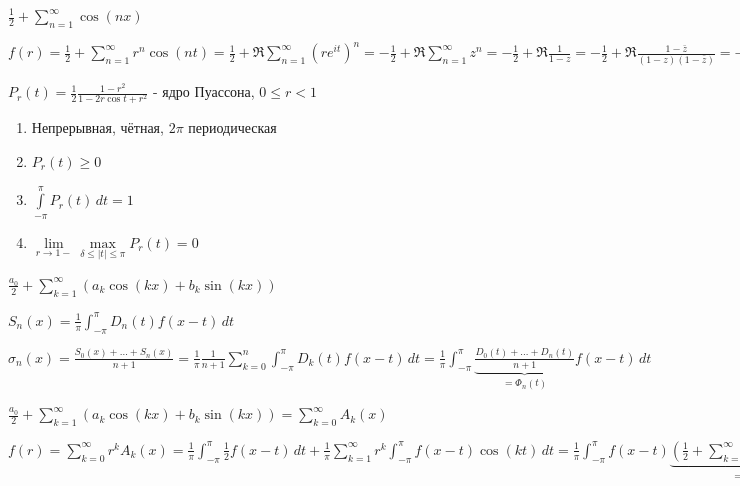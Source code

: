 \begin{example}
    $\frac{1}{2} + \sum\limits_{n=1}^\infty \cos (nx)$

    $f(r) = \frac{1}{2} + \sum\limits_{n=1}^\infty r^n \cos (nt) = \frac{1}{2} + \Re \sum\limits_{n=1}^\infty (re^{it})^n = -\frac{1}{2} + \Re \sum\limits_{n=1}^\infty z^n = - \frac{1}{2} + \Re \frac{1}{1 - z} = - \frac{1}{2} + \Re \frac{1 - \bar{z}}{(1 - z)(1 - \bar{z})} = -\frac{1}{2} + \frac{1 - \Re z}{1 + |z|^2 - 2\Re z} = 
    - \frac{1}{2} + \frac{1 - r\cos t}{1 - 2r \cos t + r^2} = \frac{1 - r^2}{2(1 - 2r \cos t + r^2)}$
\end{example}

\begin{definition}
    $P_r (t) = \frac{1}{2} \frac{1 - r^2}{1 - 2r \cos t + r^2}$ - ядро Пуассона, $0 \leqslant r < 1$
\end{definition}

\begin{properties}
    \begin{enumerate}
        \item Непрерывная, чётная, $2\pi$ периодическая
        \item {
            $P_r (t) \geqslant 0$
        }
        \item {
            $\int\limits_{-\pi}^\pi P_r (t) \, dt = 1$
        }
        \item {
            $\lim\limits_{r \to 1-} \max\limits_{\delta \leqslant |t| \leqslant \pi} P_r (t) = 0$
        }
    \end{enumerate}
    
\end{properties}

\begin{example}
    $\frac{a_0}{2} + \sum\limits_{k = 1}^\infty (a_k \cos (kx) + b_k \sin (kx))$

    $S_n (x) = \frac{1}{\pi} \int_{-\pi}^\pi D_n (t) f(x - t) \, dt$

    $\sigma_n (x) = \frac{S_0 (x) + \ldots + S_n (x)}{n + 1} = \frac{1}{\pi} \frac{1}{n+1} \sum\limits_{k = 0}^n \int_{-\pi}^\pi D_k (t) f(x - t) \, dt = \frac{1}{\pi} \int_{-\pi}^\pi \underbrace{\frac{D_0 (t) + \ldots + D_n (t)}{n + 1}}_{=\Phi_n (t)} f(x - t) \, dt $
\end{example}

\begin{example}
    $\frac{a_0}{2} + \sum\limits_{k = 1}^\infty (a_k \cos (kx) + b_k \sin (kx)) = \sum\limits_{k = 0}^\infty A_k (x)$

    $f(r) = \sum\limits_{k = 0}^\infty r^k A_k (x) = \frac{1}{\pi} \int_{-\pi}^\pi \frac{1}{2} f(x - t) \, dt + \frac{1}{\pi} \sum\limits_{k=1}^\infty r^k \int_{-\pi}^\pi f(x - t) \cos (kt) \, dt = 
    \frac{1}{\pi} \int_{-\pi}^\pi f(x - t) \underbrace{\left( \frac{1}{2} + \sum\limits_{k = 1}^\infty r^k \cos (kt) \right)}_{= P_r (t)} \, dt$
\end{example}

